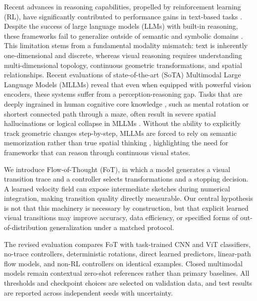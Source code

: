 \documentclass{article}
\begin{document}
Recent advances in reasoning capabilities, propelled by reinforcement learning (RL), have significantly contributed to performance gains in text-based tasks \citep{ouyang2022training, openai2024o1, deepseek2025deepseekr1, lightman2023lets}. Despite the success of large language models (LLMs) with built-in reasoning, these frameworks fail to generalize outside of semantic and symbolic domains \citep{dziri2023faith, fu2024blink, vsp2025}. This limitation stems from a fundamental modality mismatch: text is inherently one-dimensional and discrete, whereas visual reasoning requires understanding multi-dimensional topology, continuous geometric transformations, and spatial relationships. Recent evaluations of state-of-the-art (SoTA) Multimodal Large Language Models (MLLMs) reveal that even when equipped with powerful vision encoders, these systems suffer from a perception-reasoning gap. Tasks that are deeply ingrained in human cognitive core knowledge \citep{spelke2007core}, such as mental rotation or shortest connected path through a maze, often result in severe spatial hallucinations or logical collapse in MLLMs \citep{fu2024blink, vsp2025}. Without the ability to explicitly track geometric changes step-by-step, MLLMs are forced to rely on semantic memorization rather than true spatial thinking \citep{chollet2019arc}, highlighting the need for frameworks that can reason through continuous visual states.

We introduce Flow-of-Thought (FoT), in which a model generates a visual transition trace and a controller selects transformations and a stopping decision. A learned velocity field can expose intermediate sketches during numerical integration, making transition quality directly measurable. Our central hypothesis is not that this machinery is necessary by construction, but that explicit learned visual transitions may improve accuracy, data efficiency, or specified forms of out-of-distribution generalization under a matched protocol.

The revised evaluation compares FoT with task-trained CNN and ViT classifiers, no-trace controllers, deterministic rotations, direct learned predictors, linear-path flow models, and non-RL controllers on identical examples. Closed multimodal models remain contextual zero-shot references rather than primary baselines. All thresholds and checkpoint choices are selected on validation data, and test results are reported across independent seeds with uncertainty.
\end{document}
